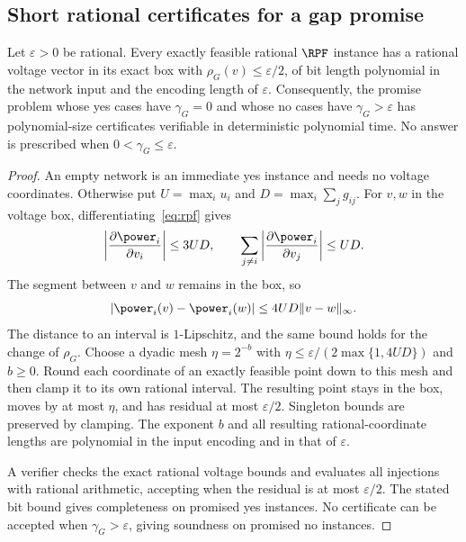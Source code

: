 \subsection{Short rational certificates for a gap promise}

\begin{proposition}
\label{prop:approx-certificates}
Let $\varepsilon>0$ be rational. Every exactly feasible rational $\RPF$
instance has a rational voltage vector in its exact box with
$\rho_G(v)\le\varepsilon/2$, of bit length polynomial in the network input
and the encoding length of $\varepsilon$. Consequently, the promise problem
whose yes cases have $\gamma_G=0$ and whose no cases have
$\gamma_G>\varepsilon$ has polynomial-size certificates verifiable in
deterministic polynomial time. No answer is prescribed when
$0<\gamma_G\le\varepsilon$.
\end{proposition}
\begin{proof}
An empty network is an immediate yes instance and needs no voltage
coordinates. Otherwise put $U=\max_i u_i$ and
$D=\max_i\sum_jg_{ij}$.
For $v,w$ in the voltage box, differentiating~\eqref{eq:rpf} gives
\[
 \left|\frac{\partial\power_i}{\partial v_i}\right|
       \le3UD,
 \qquad
 \sum_{j\ne i}\left|\frac{\partial\power_i}{\partial v_j}\right|
       \le UD.
\]
The segment between $v$ and $w$ remains in the box, so
\begin{equation}
 |\power_i(v)-\power_i(w)|\le4UD\|v-w\|_\infty.
 \label{eq:lipschitz}
\end{equation}
The distance to an interval is $1$-Lipschitz, and the same bound holds for
the change of $\rho_G$.
Choose a dyadic mesh $\eta=2^{-b}$ with
$\eta\le\varepsilon/(2\max\{1,4UD\})$ and $b\ge0$.
Round each coordinate of an exactly feasible point down to this mesh and
then clamp it to its own rational interval. The resulting point stays in
the box, moves by at most $\eta$, and has residual at most
$\varepsilon/2$. Singleton bounds are preserved by clamping. The exponent
$b$ and all resulting rational-coordinate lengths are polynomial in the
input encoding and in that of $\varepsilon$.

A verifier checks the exact rational voltage bounds and evaluates all
injections with rational arithmetic, accepting when the residual is at most
$\varepsilon/2$. The stated bit bound gives completeness on promised yes
instances. No certificate can be accepted when $\gamma_G>\varepsilon$,
giving soundness on promised no instances.
\end{proof}

